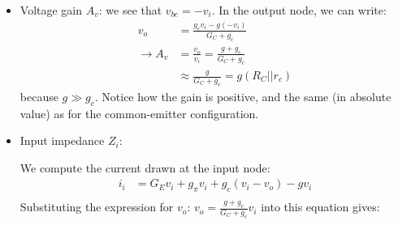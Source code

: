 \begin{itemize}
	\item Voltage gain $A_v$: we see that $v_{be} = -v_i$. In the output node, we can write:
	\begin{equation}
		\begin{split}
			v_o &= \frac{g_c v_i - g (-v_i)}{G_C + g_c} \\ 
			\rightarrow A_v &= \frac{v_o}{v_i} = \frac{g + g_c}{G_C + g_c} \\
			&\approx \frac{g}{G_C + g_c} = g (R_C || r_c)
		\end{split}
	\end{equation}
	because $g \gg g_c$. Notice how the gain is positive, and the same (in absolute value) as for the common-emitter configuration. 
	\item Input impedance $Z_i$: 

	We compute the current drawn at the input node:
	\begin{equation}
		\begin{split}
			i_i &= G_E v_i + g_{\pi} v_i + g_c (v_i - v_o) - g v_i \\
		\end{split}
	\end{equation}
	Substituting the expression for $v_o$: $v_o = \frac{g + g_c}{G_C + g_c} v_i$ into this equation gives:

\end{itemize}
